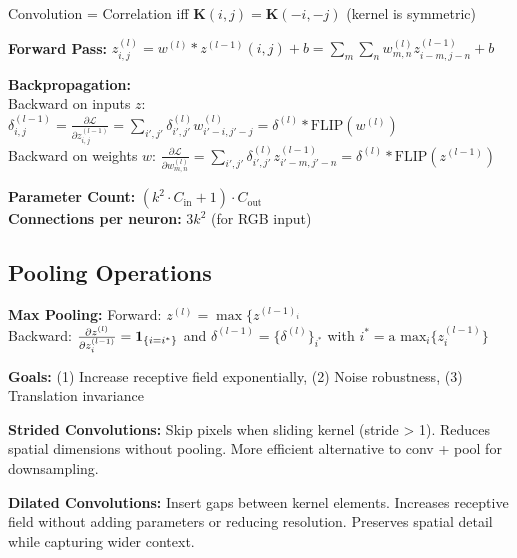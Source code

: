 \begin{highlightbox*}[gray!30]
Convolution = Correlation iff $\mathbf{K}(i,j) = \mathbf{K}(-i,-j)$ (kernel is symmetric)
\end{highlightbox*}



\textbf{Forward Pass:} $z_{i,j}^{(l)} = w^{(l)} * z^{(l-1)}(i,j) + b = \sum_m \sum_n w_{m,n}^{(l)} z_{i-m,j-n}^{(l-1)} + b$

\textbf{Backpropagation:}\\
{\small
Backward on inputs $z$: $\delta_{i,j}^{(l-1)} = \frac{\partial \mathcal{L}}{\partial z_{i,j}^{(l-1)}} = \sum_{i',j'} \delta_{i',j'}^{(l)} w_{i'-i,j'-j}^{(l)} = \delta^{(l)} * \text{FLIP}(w^{(l)})$\\
Backward on weights $w$: $\frac{\partial \mathcal{L}}{\partial w_{m,n}^{(l)}} = \sum_{i',j'} \delta_{i',j'}^{(l)} z_{i'-m,j'-n}^{(l-1)} = \delta^{(l)} * \text{FLIP}(z^{(l-1)})$
}


\textbf{Parameter Count:} $(k^2 \cdot C_{\text{in}} + 1) \cdot C_{\text{out}}$\\
\textbf{Connections per neuron:} $3k^2$ (for RGB input)


\subsection{Pooling Operations}

\textbf{Max Pooling:} 
Forward: $z^{(l)} = \max\{z^{(l-1)_i}$\\
Backward: $\frac{\partial z^{(l)}}{\partial z^{(l-1)}_i} = \mathbf{1}_{\{i = i^*\}}$ and
$\delta^{(l-1)}=\{ \delta^{(l)}\}_{i^*}$ with {\small $i^* = \text{a max}_i\{ z^{(l-1)}_i \}$}

\textbf{Goals:} (1) Increase receptive field exponentially, (2) Noise robustness, (3) Translation invariance

\textbf{Strided Convolutions:} Skip pixels when sliding kernel (stride > 1). Reduces spatial dimensions without pooling. More efficient alternative to conv + pool for downsampling.

\textbf{Dilated Convolutions:} Insert gaps between kernel elements. Increases receptive field without adding parameters or reducing resolution. Preserves spatial detail while capturing wider context.

